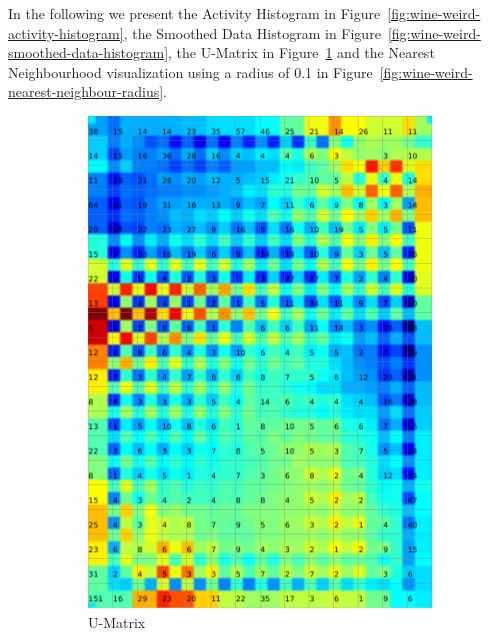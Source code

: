 \documentclass{acm_proc_article-sp}
\begin{document}
In the following we present the Activity Histogram in Figure~\ref{fig:wine-weird-activity-histogram},
the Smoothed Data Histogram in Figure~\ref{fig:wine-weird-smoothed-data-histogram},
the U-Matrix in Figure~\ref{fig:wine-weird-u-matrix} and
the Nearest Neighbourhood visualization using a radius of 0.1 in Figure~\ref{fig:wine-weird-nearest-neighbour-radius}.

\begin{figure}
\centering
    \centering
    \begin{subfigure}[b]{0.45\linewidth}
        \includegraphics[width=\linewidth]{img/wine-weird-u-matrix}
        \caption{U-Matrix}
        \label{fig:wine-weird-u-matrix}
    \end{subfigure}
    \begin{subfigure}[b]{0.45\linewidth}

\end{subfigure}
\end{figure}
\end{document}
